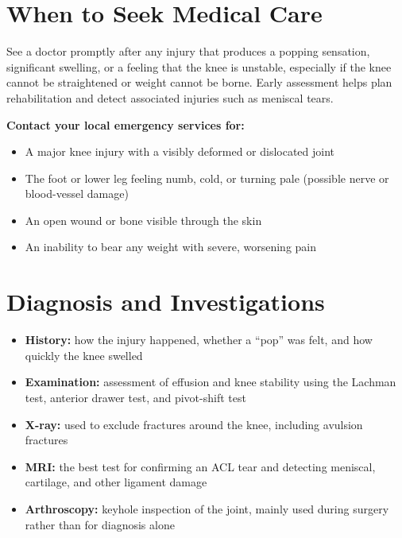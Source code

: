 \section*{When to Seek Medical Care}
See a doctor promptly after any injury that produces a popping sensation, significant swelling, or a feeling that the knee is unstable, especially if the knee cannot be straightened or weight cannot be borne. Early assessment helps plan rehabilitation and detect associated injuries such as meniscal tears.

\textbf{Contact your local emergency services for:}
\begin{itemize}
    \item A major knee injury with a visibly deformed or dislocated joint
    \item The foot or lower leg feeling numb, cold, or turning pale (possible nerve or blood-vessel damage)
    \item An open wound or bone visible through the skin
    \item An inability to bear any weight with severe, worsening pain
\end{itemize}

\section*{Diagnosis and Investigations}
\begin{itemize}
    \item \textbf{History:} how the injury happened, whether a ``pop'' was felt, and how quickly the knee swelled
    \item \textbf{Examination:} assessment of effusion and knee stability using the Lachman test, anterior drawer test, and pivot-shift test
    \item \textbf{X-ray:} used to exclude fractures around the knee, including avulsion fractures
    \item \textbf{MRI:} the best test for confirming an ACL tear and detecting meniscal, cartilage, and other ligament damage
    \item \textbf{Arthroscopy:} keyhole inspection of the joint, mainly used during surgery rather than for diagnosis alone
\end{itemize}

